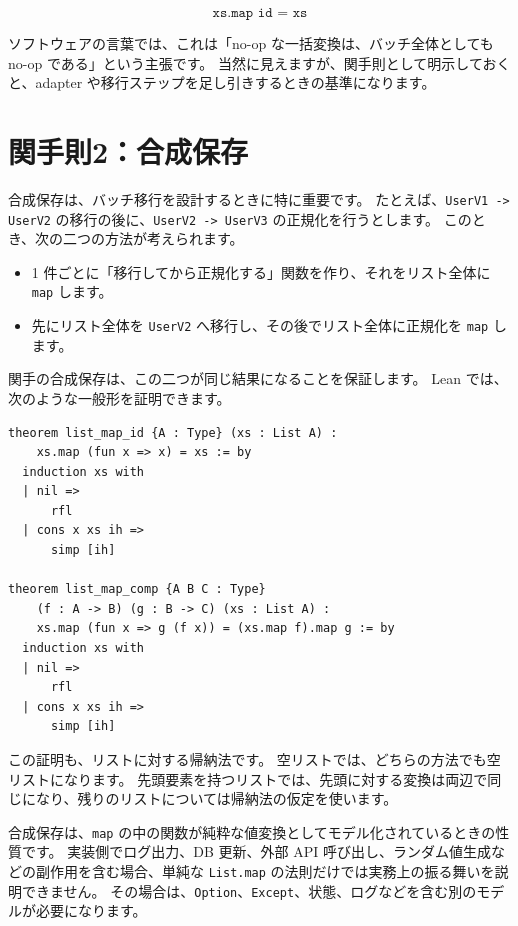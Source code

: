 \[
  \texttt{xs.map id = xs}
\]

ソフトウェアの言葉では、これは「no-op な一括変換は、バッチ全体としても no-op である」という主張です。
当然に見えますが、関手則として明示しておくと、adapter や移行ステップを足し引きするときの基準になります。

\section{関手則2：合成保存}

合成保存は、バッチ移行を設計するときに特に重要です。
たとえば、\texttt{UserV1 -> UserV2} の移行の後に、\texttt{UserV2 -> UserV3} の正規化を行うとします。
このとき、次の二つの方法が考えられます。

\begin{itemize}
\item 1 件ごとに「移行してから正規化する」関数を作り、それをリスト全体に \texttt{map} します。
\item 先にリスト全体を \texttt{UserV2} へ移行し、その後でリスト全体に正規化を \texttt{map} します。
\end{itemize}

関手の合成保存は、この二つが同じ結果になることを保証します。
Lean では、次のような一般形を証明できます。

\begin{listing}[htbp]
\begin{verbatim}
theorem list_map_id {A : Type} (xs : List A) :
    xs.map (fun x => x) = xs := by
  induction xs with
  | nil =>
      rfl
  | cons x xs ih =>
      simp [ih]

theorem list_map_comp {A B C : Type}
    (f : A -> B) (g : B -> C) (xs : List A) :
    xs.map (fun x => g (f x)) = (xs.map f).map g := by
  induction xs with
  | nil =>
      rfl
  | cons x xs ih =>
      simp [ih]
\end{verbatim}
\caption{\texttt{list\_map\_id} と \texttt{list\_map\_comp}}
\label{lst:ch30-list-functor-laws}
\end{listing}

この証明も、リストに対する帰納法です。
空リストでは、どちらの方法でも空リストになります。
先頭要素を持つリストでは、先頭に対する変換は両辺で同じになり、残りのリストについては帰納法の仮定を使います。

合成保存は、\texttt{map} の中の関数が純粋な値変換としてモデル化されているときの性質です。
実装側でログ出力、DB 更新、外部 API 呼び出し、ランダム値生成などの副作用を含む場合、単純な \texttt{List.map} の法則だけでは実務上の振る舞いを説明できません。
その場合は、\texttt{Option}、\texttt{Except}、状態、ログなどを含む別のモデルが必要になります。

